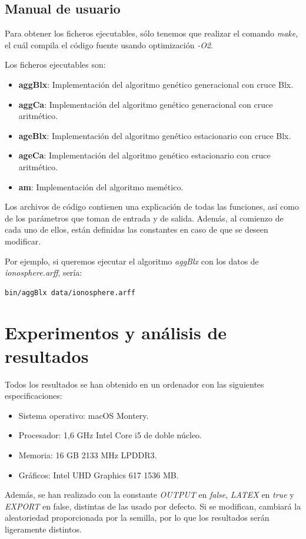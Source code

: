 \documentclass[11pt,a4paper]{article}
\begin{document}
\subsection{Manual de usuario}

Para obtener los ficheros ejecutables, sólo tenemos que realizar el comando \emph{make}, el cuál compila el código fuente usando optimización \emph{-O2}.

Los ficheros ejecutables son:
\begin{itemize}
\item \textbf{aggBlx}: Implementación del algoritmo genético generacional con cruce Blx.
\item \textbf{aggCa}: Implementación del algoritmo genético generacional con cruce aritmético.
\item \textbf{ageBlx}: Implementación del algoritmo genético estacionario con cruce Blx.
\item \textbf{ageCa}: Implementación del algoritmo genético estacionario con cruce aritmético.
\item \textbf{am}: Implementación del algoritmo memético.
\end{itemize}

Los archivos de código contienen una explicación de todas las funciones, así como de los parámetros que toman de entrada y de salida. Además, al comienzo de cada uno de ellos, están definidas las constantes en caso de que se deseen modificar.

Por ejemplo, si queremos ejecutar el algoritmo \emph{aggBlx} con los datos de \emph{ionosphere.arff}, sería:
\begin{verbatim}
bin/aggBlx data/ionosphere.arff
\end{verbatim}

\newpage
\section{Experimentos y análisis de resultados}
Todos los resultados se han obtenido en un ordenador con las siguientes especificaciones:
\begin{itemize}
\item Sistema operativo: macOS Montery.
\item Procesador: 1,6 GHz Intel Core i5 de doble núcleo.
\item Memoria: 16 GB 2133 MHz LPDDR3.
\item Gráficos: Intel UHD Graphics 617 1536 MB.
\end{itemize}
Además, se han realizado con la constante \emph{OUTPUT} en \emph{false}, \emph{LATEX} en \emph{true} y \emph{EXPORT} en false, distintas de las usado por defecto. Si se modifican, cambiará la aleatoriedad proporcionada por la semilla, por lo que los resultados serán ligeramente distintos.
\end{document}
